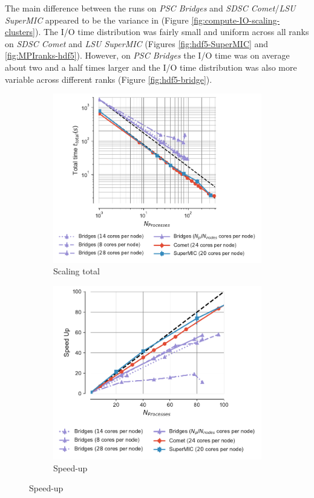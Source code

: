 The main difference between the runs on \emph{PSC Bridges} and \emph{SDSC Comet}/\emph{LSU SuperMIC} appeared to be the variance in \tIO (Figure \ref{fig:compute-IO-scaling-clusters}).
The I/O time distribution was fairly small and uniform across all ranks on \emph{SDSC Comet} and \emph{LSU SuperMIC} (Figures \ref{fig:hdf5-SuperMIC} and \ref{fig:MPIranks-hdf5}).
However, on \emph{PSC Bridges} the I/O time was on average about two and a half times larger and the I/O time distribution was also more variable across different ranks (Figure \ref{fig:hdf5-bridge}).  

\begin{figure}[!htb]
  \centering
  \begin{subfigure}{.4\textwidth}
    \includegraphics[width=\linewidth]{figures/Comparison_t-tot-clusters.pdf}
    \caption{Scaling total}
    \label{fig:MPIscaling-clusters}
  \end{subfigure}
  \hfill
  \begin{subfigure}{.4\textwidth}
    \includegraphics[width=\linewidth]{figures/Comparison_speed-up-clusters.pdf}
    \caption{Speed-up}
    \label{fig:MPIspeedup-clusters}
  \end{subfigure}
  \bigskip


\end{figure}
